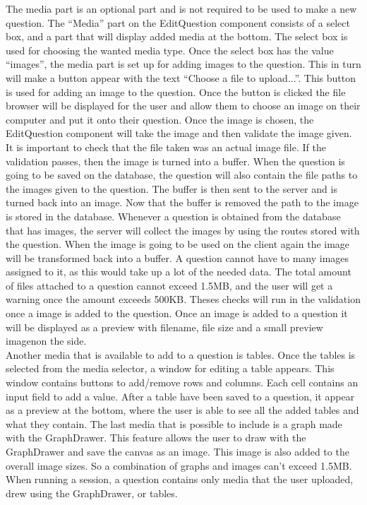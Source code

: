 The media part is an optional part and is not required to be used to make a new question. The “Media” part on the EditQuestion component consists of a select box, and a part that will display added media at the bottom. The select box is used for choosing the wanted media type. Once the select box has the value “images”, the media part is set up for adding images to the question. This in turn will make a button appear with the text “Choose a file to upload...”. This button is used for adding an image to the question. Once the button is clicked the file browser will be displayed for the user and allow them to choose an image on their computer and put it onto their question. Once the image is chosen, the EditQuestion component will take the image and then validate the image given. It is important to check that the file taken was an actual image file. If the validation passes, then the image is turned into a buffer. When the question is going to be saved on the database, the question will also contain the file paths to the images given to the question. The buffer is then sent to the server and is turned back into an image. Now that the buffer is removed the path to the image is stored in the database. Whenever a question is obtained from the database that has images, the server will collect the images by using the routes stored with the question. When the image is going to be used on the client again the image will be transformed back into a buffer. A question cannot have to many images assigned to it, as this would take up a lot of the needed data. The total amount of files attached to a question cannot exceed 1.5MB, and the user will get a warning once the amount exceeds 500KB. Theses checks will run in the validation once a image is added to the question. Once an image is added to a question it will be displayed as a preview with filename, file size and a small preview imagenon the side.
\\[11pt]
Another media that is available to add to a question is tables. Once the tables is selected from the media selector, a window for editing a table appears. This window contains buttons to add/remove rows and columns. Each cell contains an input field to add a value. After a table have been saved to a question, it appear as a preview at the bottom, where the user is able to see all the added tables and what they contain. The last media that is possible to include is a graph made with the GraphDrawer. This feature allows the user to draw with the GraphDrawer and save the canvas as an image. This image is also added to the overall image sizes. So a combination of graphs and images can't exceed 1.5MB. When running a session, a question contains only media that the user uploaded, drew using the GraphDrawer, or tables.

